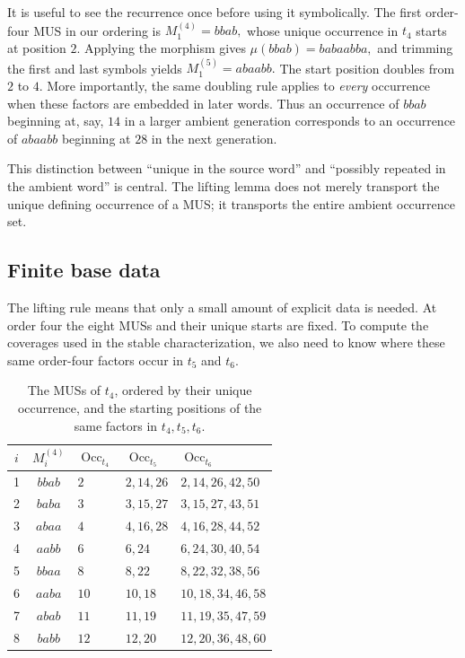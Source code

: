 \documentclass[10pt,a4paper]{article}
\theoremstyle{definition}\newtheorem{definition}[theorem]{Definition}
\theoremstyle{remark}\newtheorem{remark}[theorem]{Remark}
\newcommand{\Occ}{\operatorname{Occ}}
\begin{document}
It is useful to see the recurrence once before using it symbolically. The first order-four MUS in our ordering is
$
M_1^{(4)}=bbab,
$
whose unique occurrence in $t_4$ starts at position $2$. Applying the morphism gives
$
\mu(bbab)=babaabba,
$
and trimming the first and last symbols yields
$
M_1^{(5)}=abaabb.
$
The start position doubles from $2$ to $4$. More importantly, the same doubling rule applies to \emph{every} occurrence when these factors are embedded in later words. Thus an occurrence of $bbab$ beginning at, say, $14$ in a larger ambient generation corresponds to an occurrence of $abaabb$ beginning at $28$ in the next generation.

This distinction between ``unique in the source word'' and ``possibly repeated in the ambient word'' is central. The lifting lemma does not merely transport the unique defining occurrence of a MUS; it transports the entire ambient occurrence set.

\subsection{Finite base data}
\label{subsec:base-data}

The lifting rule means that only a small amount of explicit data is needed. At order four the eight MUSs and their unique starts are fixed. To compute the coverages used in the stable characterization, we also need to know where these same order-four factors occur in $t_5$ and $t_6$.

\begin{table}[ht]
\centering
\caption{The MUSs of $t_4$, ordered by their unique occurrence, and the starting positions of the same factors in $t_4,t_5,t_6$.}
\label{tab:base-occurrences}
\begin{tabular}{@{}cclll@{}}
\toprule
$i$ & $M_i^{(4)}$ & $\Occ_{t_4}$ & $\Occ_{t_5}$ & $\Occ_{t_6}$ \\
\midrule
1 & $bbab$ & $2$  & $2,14,26$ & $2,14,26,42,50$ \\
2 & $baba$ & $3$  & $3,15,27$ & $3,15,27,43,51$ \\
3 & $abaa$ & $4$  & $4,16,28$ & $4,16,28,44,52$ \\
4 & $aabb$ & $6$  & $6,24$    & $6,24,30,40,54$ \\
5 & $bbaa$ & $8$  & $8,22$    & $8,22,32,38,56$ \\
6 & $aaba$ & $10$ & $10,18$   & $10,18,34,46,58$ \\
7 & $abab$ & $11$ & $11,19$   & $11,19,35,47,59$ \\
8 & $babb$ & $12$ & $12,20$   & $12,20,36,48,60$ \\
\bottomrule
\end{tabular}
\end{table}
\end{document}
